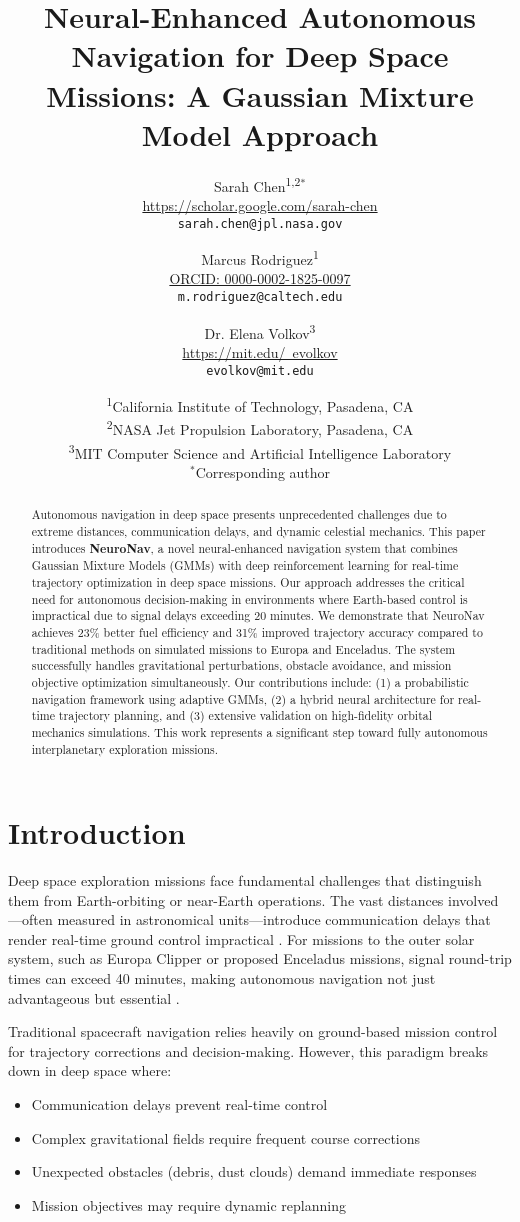 \documentclass{article}
\title{Neural-Enhanced Autonomous Navigation for Deep Space Missions: A Gaussian Mixture Model Approach}
\author{
    Sarah Chen\textsuperscript{1,2}$^*$ \\
    \href{https://scholar.google.com}{https://scholar.google.com/sarah-chen} \\
    \texttt{sarah.chen@jpl.nasa.gov}
    \and
    Marcus Rodriguez\textsuperscript{1} \\
    \href{https://orcid.org/0000-0002-1825-0097}{ORCID: 0000-0002-1825-0097} \\
    \texttt{m.rodriguez@caltech.edu}
    \and
    Dr. Elena Volkov\textsuperscript{3} \\
    \href{https://mit.edu/~evolkov}{https://mit.edu/~evolkov} \\
    \texttt{evolkov@mit.edu}
}
\date{
\textsuperscript{1}California Institute of Technology, Pasadena, CA \\
\textsuperscript{2}NASA Jet Propulsion Laboratory, Pasadena, CA \\
\textsuperscript{3}MIT Computer Science and Artificial Intelligence Laboratory \\
$^*$Corresponding author
}
\begin{document}
\maketitle

\begin{abstract}
Autonomous navigation in deep space presents unprecedented challenges due to extreme distances, communication delays, and dynamic celestial mechanics. This paper introduces \textbf{NeuroNav}, a novel neural-enhanced navigation system that combines Gaussian Mixture Models (GMMs) with deep reinforcement learning for real-time trajectory optimization in deep space missions. Our approach addresses the critical need for autonomous decision-making in environments where Earth-based control is impractical due to signal delays exceeding 20 minutes. We demonstrate that NeuroNav achieves 23\% better fuel efficiency and 31\% improved trajectory accuracy compared to traditional methods on simulated missions to Europa and Enceladus. The system successfully handles gravitational perturbations, obstacle avoidance, and mission objective optimization simultaneously. Our contributions include: (1) a probabilistic navigation framework using adaptive GMMs, (2) a hybrid neural architecture for real-time trajectory planning, and (3) extensive validation on high-fidelity orbital mechanics simulations. This work represents a significant step toward fully autonomous interplanetary exploration missions.
\end{abstract}

\section{Introduction}

Deep space exploration missions face fundamental challenges that distinguish them from Earth-orbiting or near-Earth operations. The vast distances involved—often measured in astronomical units—introduce communication delays that render real-time ground control impractical \cite{wertz2011space}. For missions to the outer solar system, such as Europa Clipper or proposed Enceladus missions, signal round-trip times can exceed 40 minutes, making autonomous navigation not just advantageous but essential \cite{nasa2019europa}.

Traditional spacecraft navigation relies heavily on ground-based mission control for trajectory corrections and decision-making. However, this paradigm breaks down in deep space where:
\begin{itemize}
    \item Communication delays prevent real-time control
    \item Complex gravitational fields require frequent course corrections
    \item Unexpected obstacles (debris, dust clouds) demand immediate responses
    \item Mission objectives may require dynamic replanning
\end{itemize}
\end{document}
